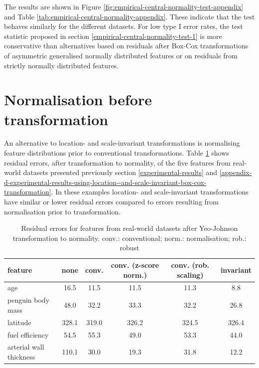 \documentclass[preprint,12pt,authoryear]{elsarticle}
\begin{document}
The results are shown in Figure
\ref{fig:empirical-central-normality-test-appendix} and Table
\ref {tab:empirical-central-normality-appendix}. These indicate that the
test behaves similarly for the different datasets. For low type I error
rates, the test statistic proposed in section \ref{empirical-central-normality-test-1} is more
conservative than alternatives based on residuals after Box-Cox
transformations of asymmetric generalised normally distributed features
or on residuals from strictly normally distributed features.

\section{Normalisation before transformation}\label{appendix-f-normalisation-before-transformation}

An alternative to location- and scale-invariant transformations is
normalising feature distributions prior to conventional transformations.
Table \ref{tab:normalisation-before-transformation-appendix} shows
residual errors, after transformation to normality, of the five features
from real-world datasets presented previously section \ref{experimental-results}
and \ref{appendix-d-experimental-results-using-location--and-scale-invariant-box-cox-transformation}.
In these examples location- and scale-invariant
transformations have similar or lower residual errors compared to errors
resulting from normalisation prior to transformation.

\begin{table}
\begin{center}
\caption{Residual errors for features from real-world datasets after Yeo-Johnson transformation to normality. conv.: conventional; norm.: normalisation; rob.: robust}
\label{tab:normalisation-before-transformation-appendix}
\begin{tabular}{l | c c c c c}

\toprule
feature & none & conv. & conv. (z-score norm.) & conv. (rob. scaling) & invariant \\

\midrule
age                     &  16.5 &  11.5 &  11.5 &  11.3 &   8.8 \\
penguin body mass       &  48.0 &  32.2 &  33.3 &  32.2 &  26.8 \\
latitude                & 328.1 & 319.0 & 326.2 & 324.5 & 326.4 \\
fuel efficiency         &  54.5 &  55.3 &  49.0 &  53.3 &  44.0 \\
arterial wall thickness & 110.1 &  30.0 &  19.3 &  31.8 &  12.2 \\
\bottomrule
\end{tabular}
\end{center}
\end{table}





\end{document}

